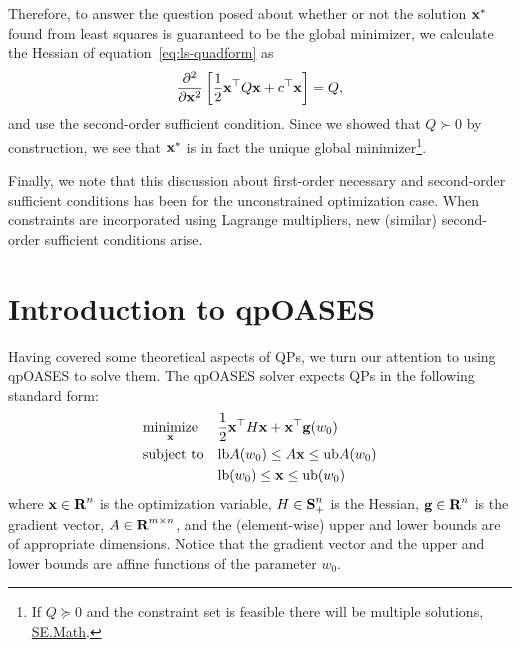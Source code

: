 \documentclass[10pt]{article}
\begin{document}
Therefore, to answer the question posed about whether or not the solution $\mathbf{x}^*$ found from least squares is guaranteed to be the global minimizer, we calculate the Hessian of equation~\eqref{eq:ls-quadform} as
\begin{equation}
\frac{\partial^2}{\partial \mathbf{x}^2}\left[ \frac{1}{2}\mathbf{x}^\top Q\mathbf{x} + c^\top\mathbf{x} \right] = Q,
\end{equation}
and use the second-order sufficient condition.
Since we showed that $Q\succ0$ by construction, we see that $\mathbf{x}^*$ is in fact the unique global minimizer\footnote{If $Q\succeq0$ and the constraint set is feasible there will be multiple solutions, \href{https://math.stackexchange.com/questions/2153050/does-a-convex-quadratic-program-have-a-unique-solution}{SE.Math}.}.

Finally, we note that this discussion about first-order necessary and second-order sufficient conditions has been for the unconstrained optimization case.
When constraints are incorporated using Lagrange multipliers, new (similar) second-order sufficient conditions arise.

\section*{Introduction to qpOASES}
Having covered some theoretical aspects of QPs, we turn our attention to using qpOASES to solve them.
The qpOASES solver expects QPs in the following standard form:
\begin{equation}\label{eq:qpoases-standard-qp}
\begin{aligned}
& \underset{\mathbf{x}}{\text{minimize}}
& & \frac{1}{2}\mathbf{x}^\top H\mathbf{x} + \mathbf{x}^\top\mathbf{g}(w_0) \\
& \text{subject to}
& & \text{lb} A(w_0) \leq A\mathbf{x} \leq \text{ub} A(w_0)\\
&&& \text{lb}(w_0) \leq \mathbf{x} \leq \text{ub}(w_0)
\end{aligned}
\end{equation}
where $\mathbf{x}\in{\mbox{\bf R}}^n$ is the optimization variable, $H\in{\mbox{\bf S}}^n_+$ is the Hessian, $\mathbf{g}\in{\mbox{\bf R}}^n$ is the gradient vector, $A\in{\mbox{\bf R}}^{m\times n}$, and the (element-wise) upper and lower bounds are of appropriate dimensions.
Notice that the gradient vector and the upper and lower bounds are affine functions of the parameter $w_0$.
\end{document}
